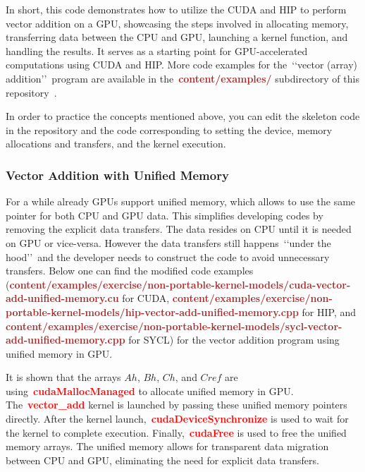 \par
In short, this code demonstrates how to utilize the CUDA and HIP to perform vector addition on a GPU, showcasing the steps involved in allocating memory, transferring data between the CPU and GPU, launching a kernel function, and handling the results.
It serves as a starting point for GPU-accelerated computations using CUDA and HIP.
More code examples for the~\lq\lq vector (array) addition\rq\rq~program are available in the~\textbf{\textcolor{brown}{content/examples/}} subdirectory of this repository~\cite{gpu-programming-examples}.


\par
In order to practice the concepts mentioned above, you can edit the skeleton code in the repository and the code corresponding to setting the device, memory allocations and transfers, and the kernel execution.


\subsubsection{Vector Addition with Unified Memory}


\par
For a while already GPUs support unified memory, which allows to use the same pointer for both CPU and GPU data.
This simplifies developing codes by removing the explicit data transfers.
The data resides on CPU until it is needed on GPU or vice-versa.
However the data transfers still happens~\lq\lq under the hood\rq\rq~and the developer needs to construct the code to avoid unnecessary transfers.
Below one can find the modified code examples (\textbf{\textcolor{brown}{content/examples/exercise/non-portable-kernel-models/cuda-vector-add-unified-memory.cu}} for CUDA, \textbf{\textcolor{brown}{content/examples/exercise/non-portable-kernel-models/hip-vector-add-unified-memory.cpp}} for HIP, and \textbf{\textcolor{brown}{content/examples/exercise/non-portable-kernel-models/sycl-vector-add-unified-memory.cpp}} for SYCL) for the vector addition program using unified memory in GPU.

\par
It is shown that the arrays $Ah$, $Bh$, $Ch$, and $Cref$ are using~\textbf{\textcolor{red}{cudaMallocManaged}} to allocate unified memory in GPU.
The~\textbf{\textcolor{red}{vector\_add}} kernel is launched by passing these unified memory pointers directly.
After the kernel launch,~\textbf{\textcolor{red}{cudaDeviceSynchronize}} is used to wait for the kernel to complete execution.
Finally,~\textbf{\textcolor{red}{cudaFree}} is used to free the unified memory arrays.
The unified memory allows for transparent data migration between CPU and GPU, eliminating the need for explicit data transfers.


